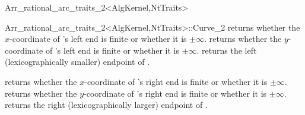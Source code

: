 \begin{ccRefClass}{Arr_rational_arc_traits_2<AlgKernel,NtTraits>}
\begin{ccClass}{Arr_rational_arc_traits_2<AlgKernel,NtTraits>::Curve_2}
  {returns whether the $x$-coordinate of \ccVar's left end is finite or
   whether it is $\pm\infty$.}
\ccGlue
{}
  {returns whether the $y$-coordinate of \ccVar's left end is finite or
   whether it is $\pm\infty$.}
\ccGlue
{}
  {returns the left (lexicographically smaller) endpoint of \ccVar{}.
   }

  {returns whether the $x$-coordinate of \ccVar's right end is finite or
   whether it is $\pm\infty$.}
\ccGlue
{}
  {returns whether the $y$-coordinate of \ccVar's right end is finite or
   whether it is $\pm\infty$.}
\ccGlue
{}
  {returns the right (lexicographically larger) endpoint of \ccVar{}.
   }

\end{ccClass}

\end{ccRefClass}
\ccRefPageEnd
